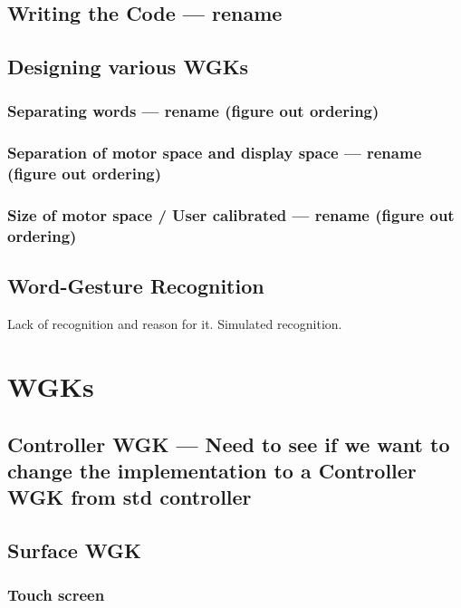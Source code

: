 \subsection{Writing the Code --- rename}

\subsection{Designing various WGKs}

\subsubsection{Separating words --- rename (figure out ordering)}

\subsubsection{Separation of motor space and display space --- rename (figure out ordering)}

\subsubsection{Size of motor space / User calibrated --- rename (figure out ordering)}

\subsection{Word-Gesture Recognition}

Lack of recognition and reason for it. Simulated recognition.

\section{WGKs}

\subsection{Controller WGK --- Need to see if we want to change the implementation to a Controller WGK from std controller}

\subsection{Surface WGK}

\subsubsection{Touch screen}

